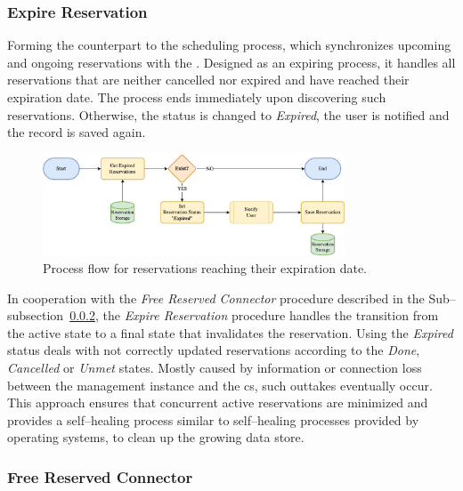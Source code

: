 \subsubsection{Expire Reservation}
\label{ch:Design:sec:Reservation System:ssec:Scheduling Capabilities:sssec:Expire Reservation}

Forming the counterpart to the scheduling process, which synchronizes upcoming and ongoing reservations with the . Designed as an expiring process, it handles all reservations that are neither cancelled nor expired and have reached their expiration date.
The process ends immediately upon discovering such reservations. Otherwise, the status is changed to \textit{Expired}, the user is notified and the record is saved again.

\begin{figure}[h]
    \centering
    \includegraphics[width=0.8\textwidth,keepaspectratio]{resources/images/main/5_design/processes/scheduler/UpdateExpiredReservations.png}
    \caption{Process flow for reservations reaching their expiration date.}
    \label{fig:expire-reservation-flowchart}
\end{figure}

\noindent In cooperation with the \textit{Free Reserved Connector} procedure described in the Sub--subsection~\ref{ch:Design:sec:Reservation System:ssec:Scheduling Capabilities:sssec:Free Reserved Connector}, the \textit{Expire Reservation} procedure handles the transition from the active state to a final state that invalidates the reservation.
Using the \textit{Expired} status deals with not correctly updated reservations according to the \textit{Done}, \textit{Cancelled} or \textit{Unmet} states. 
Mostly caused by information or connection loss between the management instance and the \acrshort{cs}, such outtakes eventually occur.
This approach ensures that concurrent active reservations are minimized and provides a self--healing process similar to self--healing processes provided by operating systems, to clean up the growing data store.

\subsubsection{Free Reserved Connector}
\label{ch:Design:sec:Reservation System:ssec:Scheduling Capabilities:sssec:Free Reserved Connector}

